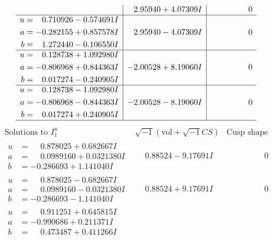 \documentclass[1p]{elsarticle_modified}
\theoremstyle{definition}
\newcommand{\I}{\sqrt{-1}}
\begin{document}
$$\begin{array}{c|c|c}
 & \phantom{-}2.95940 + 4.07309 I & \phantom{-0.000000 } 0 \\ \hline\begin{aligned}
u &= \phantom{-}0.710926 - 0.574691 I \\
a &= -0.282155 + 0.857578 I \\
b &= \phantom{-}1.272440 - 0.106550 I\end{aligned}
 & \phantom{-}2.95940 - 4.07309 I & \phantom{-0.000000 } 0 \\ \hline\begin{aligned}
u &= \phantom{-}0.128738 + 1.092980 I \\
a &= -0.806968 + 0.844363 I \\
b &= \phantom{-}0.017274 - 0.240905 I\end{aligned}
 & -2.00528 + 8.19060 I & \phantom{-0.000000 } 0 \\ \hline\begin{aligned}
u &= \phantom{-}0.128738 - 1.092980 I \\
a &= -0.806968 - 0.844363 I \\
b &= \phantom{-}0.017274 + 0.240905 I\end{aligned}
 & -2.00528 - 8.19060 I & \phantom{-0.000000 } 0\\
 \hline 
 \end{array}$$\newpage$$\begin{array}{c|c|c}  
\text{Solutions to }I^u_{1}& \I (\text{vol} + \sqrt{-1}CS) & \text{Cusp shape}\\
 \hline 
\begin{aligned}
u &= \phantom{-}0.878025 + 0.682667 I \\
a &= \phantom{-}0.0989160 + 0.0321380 I \\
b &= -0.286693 + 1.141040 I\end{aligned}
 & \phantom{-}0.88524 - 9.17691 I & \phantom{-0.000000 } 0 \\ \hline\begin{aligned}
u &= \phantom{-}0.878025 - 0.682667 I \\
a &= \phantom{-}0.0989160 - 0.0321380 I \\
b &= -0.286693 - 1.141040 I\end{aligned}
 & \phantom{-}0.88524 + 9.17691 I & \phantom{-0.000000 } 0 \\ \hline\begin{aligned}
u &= \phantom{-}0.911251 + 0.645815 I \\
a &= -0.990686 + 0.211371 I \\
b &= \phantom{-}0.473487 + 0.411266 I\end{aligned}

\end{array}$$
\end{document}
